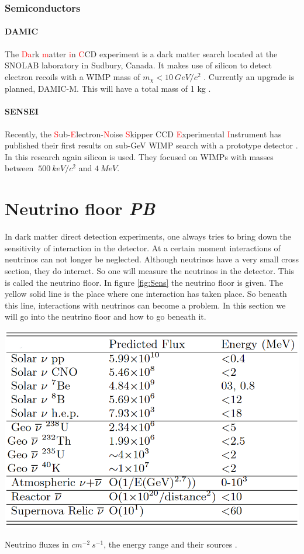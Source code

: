 \documentclass{article}
\begin{document}
\subsubsection{Semiconductors}
\paragraph{DAMIC}
The \textcolor{red}{Da}rk \textcolor{red}{m}atter \textcolor{red}{i}n \textcolor{red}{C}CD experiment is a dark matter search located at the SNOLAB laboratory in Sudbury, Canada. It makes use of silicon to detect electron recoils with a WIMP mass of $m_\chi < 10\ GeV/c^2$ \cite{Aguilar-Arevalo:2016ndq}. Currently an upgrade is planned, DAMIC-M. This will have a total mass of 1 kg \cite{Settimo:2018qcm}.
\paragraph{SENSEI}
Recently, the \textcolor{red}{S}ub-\textcolor{red}{E}lectron-\textcolor{red}{N}oise \textcolor{red}{S}kipper CCD \textcolor{red}{E}xperimental \textcolor{red}{I}nstrument has published their first results on sub-GeV WIMP search with a prototype detector \cite{Crisler:2018gci}. In this research again silicon is used. They focused on WIMPs with masses between $~500\ keV/c^2$ and $4\ MeV$.
 

\FloatBarrier
\newpage
\section{Neutrino floor \small{\textit{PB}}}
\label{sec:floor}
In dark matter direct detection experiments, one always tries to bring down the sensitivity of interaction in the detector. At a certain moment interactions of neutrinos can not longer be neglected. Although neutrinos have a very small cross section, they do interact. So one will measure the neutrinos in the detector. This is called the neutrino floor. In figure \ref{fig:Sens} the neutrino floor is given. The yellow solid line is the place where one interaction has taken place. So beneath this line, interactions with neutrinos can become a problem. In this section we will go into the neutrino floor and how to go beneath it.

\begin{table}[h!]
    \centering
    \includegraphics[width=.8\textwidth]{Neutrino_fluxes.PNG}
    \caption{Neutrino fluxes in $cm^{-2}\ s^{-1}$, the energy range and their sources \cite{Monroe:2007xp}.}
    \label{tab:neutrino_flux}
\end{table}
\end{document}
